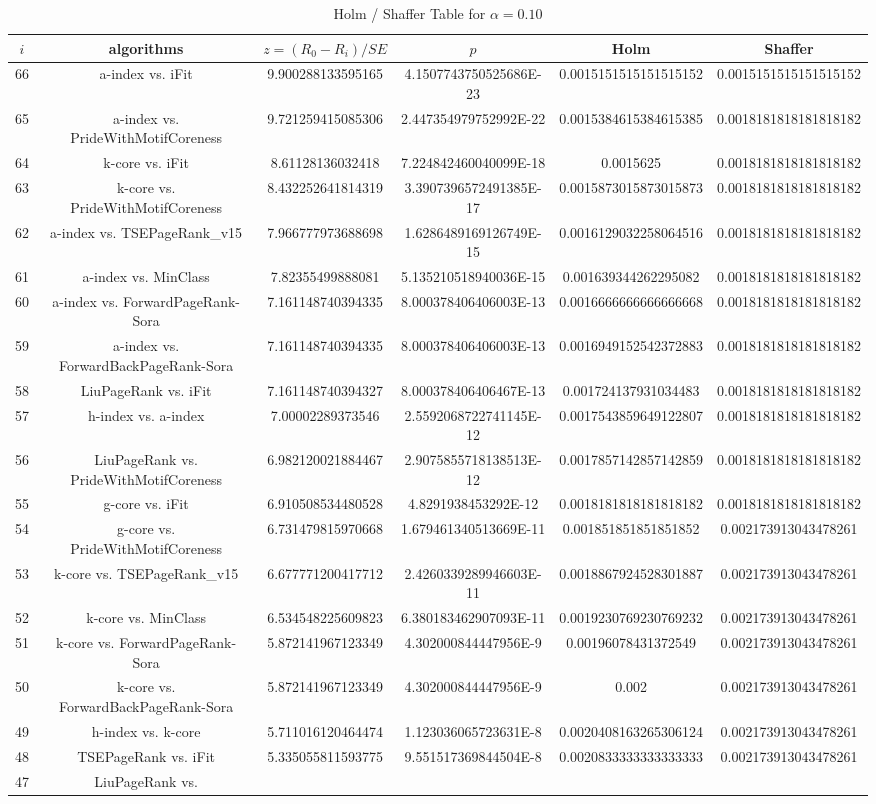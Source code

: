 \documentclass[a4paper,10pt]{article}
\begin{document}
\begin{landscape}
\begin{table}[!htp]
\centering\tiny
\caption{Holm / Shaffer Table for $\alpha=0.10$}
\begin{tabular}{cccccc}
$i$&algorithms&$z=(R_0 - R_i)/SE$&$p$&Holm&Shaffer\\
\hline
66&a-index vs. iFit&9.900288133595165&4.1507743750525686E-23&0.0015151515151515152&0.0015151515151515152\\65&a-index vs. PrideWithMotifCoreness&9.721259415085306&2.447354979752992E-22&0.0015384615384615385&0.0018181818181818182\\64&k-core vs. iFit&8.61128136032418&7.224842460040099E-18&0.0015625&0.0018181818181818182\\63&k-core vs. PrideWithMotifCoreness&8.432252641814319&3.3907396572491385E-17&0.0015873015873015873&0.0018181818181818182\\62&a-index vs. TSEPageRank_v15&7.966777973688698&1.6286489169126749E-15&0.0016129032258064516&0.0018181818181818182\\61&a-index vs. MinClass&7.82355499888081&5.135210518940036E-15&0.001639344262295082&0.0018181818181818182\\60&a-index vs. ForwardPageRank-Sora&7.161148740394335&8.000378406406003E-13&0.0016666666666666668&0.0018181818181818182\\59&a-index vs. ForwardBackPageRank-Sora&7.161148740394335&8.000378406406003E-13&0.0016949152542372883&0.0018181818181818182\\58&LiuPageRank vs. iFit&7.161148740394327&8.000378406406467E-13&0.001724137931034483&0.0018181818181818182\\57&h-index vs. a-index&7.00002289373546&2.5592068722741145E-12&0.0017543859649122807&0.0018181818181818182\\56&LiuPageRank vs. PrideWithMotifCoreness&6.982120021884467&2.9075855718138513E-12&0.0017857142857142859&0.0018181818181818182\\55&g-core vs. iFit&6.910508534480528&4.8291938453292E-12&0.0018181818181818182&0.0018181818181818182\\54&g-core vs. PrideWithMotifCoreness&6.731479815970668&1.679461340513669E-11&0.001851851851851852&0.002173913043478261\\53&k-core vs. TSEPageRank_v15&6.677771200417712&2.4260339289946603E-11&0.0018867924528301887&0.002173913043478261\\52&k-core vs. MinClass&6.534548225609823&6.380183462907093E-11&0.0019230769230769232&0.002173913043478261\\51&k-core vs. ForwardPageRank-Sora&5.872141967123349&4.302000844447956E-9&0.00196078431372549&0.002173913043478261\\50&k-core vs. ForwardBackPageRank-Sora&5.872141967123349&4.302000844447956E-9&0.002&0.002173913043478261\\49&h-index vs. k-core&5.711016120464474&1.123036065723631E-8&0.0020408163265306124&0.002173913043478261\\48&TSEPageRank vs. iFit&5.335055811593775&9.551517369844504E-8&0.0020833333333333333&0.002173913043478261\\47&LiuPageRank vs. 
\end{tabular}
\end{table}
\end{landscape}
\end{document}
